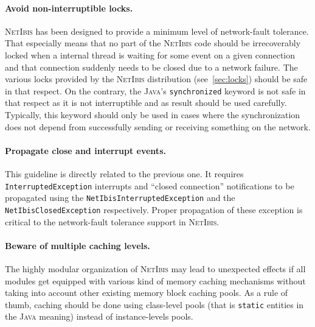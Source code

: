 \documentclass[11pt]{book}
\def\NetIbis{\textsc{NetIbis}\xspace}
\begin{document}
\paragraph{Avoid non-interruptible locks.}
\label{sec:avoid-non-interr}

\NetIbis has been designed to provide a minimum level of network-fault
tolerance. That especially means that no part of the \NetIbis code
should be irrecoverably locked when a internal thread is waiting for
some event on a given connection and that connection suddenly needs to
be closed due to a network failure. The various locks provided by the
\NetIbis distribution (see~\ref{sec:locks}) should be safe in that
respect. On the contrary, the \textsc{Java}'s \texttt{synchronized}
keyword is not safe in that respect as it is not interruptible and as
result should be used carefully. Typically, this keyword should only
be used in cases where the synchronization does not depend from
successfully sending or receiving something on the network.


\paragraph{Propagate close and interrupt events.}
\label{sec:prop-close-interr}

This guideline is directly related to the previous one. It requires
\texttt{InterruptedException} interrupts and ``closed connection''
notifications to be propagated using the
\texttt{NetIbisInterruptedException} and the
\texttt{NetIbisClosedException} respectively. Proper propagation of
these exception is critical to the network-fault tolerance support in
\NetIbis.


\paragraph{Beware of multiple caching levels.}
\label{sec:beware-mult-cach}

The highly modular organization of \NetIbis may lead to unexpected
effects if all modules get equipped with various kind of memory
caching mechanisms without taking into account other existing memory
block caching pools. As a rule of thumb, caching should be done using
class-level pools (that is \texttt{static} entities in the
\textsc{Java} meaning) instead of instance-levels pools. 
\end{document}
